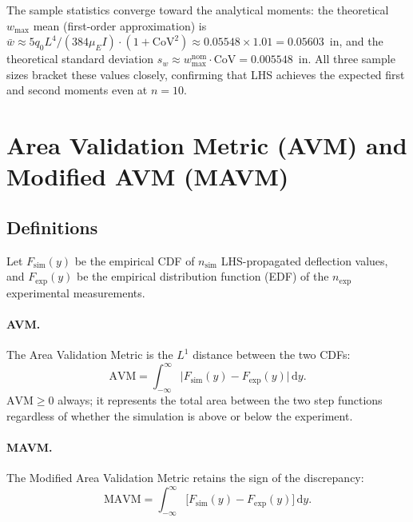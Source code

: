 \documentclass[11pt,letterpaper]{article}
\newcommand{\AVM}{\mathrm{AVM}}
\newcommand{\MAVM}{\mathrm{MAVM}}
\newcommand{\Fsim}{F_{\mathrm{sim}}}
\newcommand{\Fexp}{F_{\mathrm{exp}}}
\newcommand{\wmax}{w_{\max}}
\newcommand{\muE}{\mu_E}
\begin{document}
The sample statistics converge toward the analytical moments:
the theoretical $\wmax$ mean (first-order approximation) is
$\bar{w} \approx 5q_0L^4/(384 \muE I) \cdot (1 + \mathrm{CoV}^2) \approx 0.05548\times1.01 = 0.05603$~in,
and the theoretical standard deviation $s_w \approx \wmax^{\mathrm{nom}} \cdot \mathrm{CoV} = 0.005548$~in.
All three sample sizes bracket these values closely, confirming that LHS achieves
the expected first and second moments even at $n = 10$.

\section{Area Validation Metric (AVM) and Modified AVM (MAVM)}
\label{sec:avm}

\subsection{Definitions}

Let $\Fsim(y)$ be the empirical CDF of $n_{\mathrm{sim}}$ LHS-propagated
deflection values, and $\Fexp(y)$ be the empirical distribution function (EDF)
of the $n_{\mathrm{exp}}$ experimental measurements.

\paragraph{AVM.}
The Area Validation Metric is the $L^1$ distance between the two CDFs:
\begin{equation}
  \AVM = \int_{-\infty}^{\infty} \bigl|\Fsim(y) - \Fexp(y)\bigr|\,\mathrm{d}y.
  \label{eq:avm}
\end{equation}
$\AVM \ge 0$ always; it represents the total area between the two step functions
regardless of whether the simulation is above or below the experiment.

\paragraph{MAVM.}
The Modified Area Validation Metric retains the sign of the discrepancy:
\begin{equation}
  \MAVM = \int_{-\infty}^{\infty} \bigl[\Fsim(y) - \Fexp(y)\bigr]\,\mathrm{d}y.
  \label{eq:mavm}
\end{equation}
\end{document}
